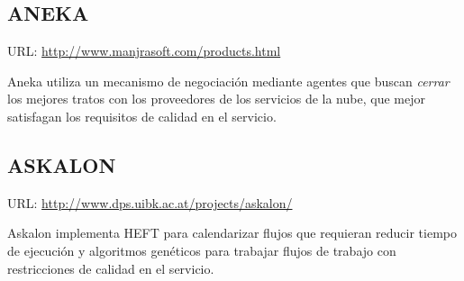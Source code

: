 \subsection{ANEKA}
URL: \url{http://www.manjrasoft.com/products.html}

Aneka utiliza un mecanismo de negociación mediante agentes que buscan \emph{cerrar} los mejores tratos con los proveedores de los servicios de la nube, que mejor satisfagan los requisitos de calidad en el servicio.

 
\subsection{ASKALON}
URL: \url{http://www.dps.uibk.ac.at/projects/askalon/}

Askalon implementa HEFT para calendarizar flujos que requieran reducir tiempo de ejecución y algoritmos genéticos para trabajar flujos de trabajo con restricciones de calidad en el servicio.